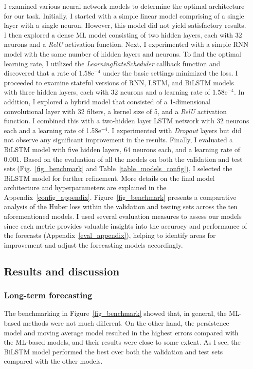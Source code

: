I examined various neural network models to determine the optimal architecture for our task.
Initially, I started with a simple linear model comprising of a single layer with a single neuron. However, this model did not yield satisfactory results.
I then explored a dense ML model consisting of two hidden layers, each with 32 neurons and a \textit{RelU} activation function. Next, I experimented with a simple RNN model with the same number of hidden layers and neurons.
To find the optimal learning rate, I utilized the \textit{LearningRateScheduler} callback function and discovered that a rate of 1.58e$^{-4}$ under the basic settings minimized the loss.
I proceeded to examine stateful versions of RNN, LSTM, and BiLSTM models with three hidden layers, each with 32 neurons and a learning rate of 1.58e$^{-4}$.
In addition, I explored a hybrid model that consisted of a 1-dimensional convolutional layer with 32 filters, a kernel size of 5, and a \textit{RelU} activation function. I combined this with a two-hidden layer LSTM network with 32 neurons each and a learning rate of 1.58e$^{-4}$. I experimented with \textit{Dropout} layers but did not observe any significant improvement in the results.
Finally, I evaluated a BiLSTM model with five hidden layers, 64 neurons each, and a learning rate of 0.001.
Based on the evaluation of all the models on both the validation and test sets (Fig.~\ref{fig_benchmark} and Table~\ref{table_models_config}), I selected the BiLSTM model for further refinement. More details on the final model architecture and hyperparameters are explained in the Appendix~\ref{config_appendix}.
Figure~\ref{fig_benchmark} presents a comparative analysis of the Huber loss within the validation and testing sets across the ten aforementioned models.
I used several evaluation measures to assess our models since each metric provides valuable insights into the accuracy and performance of the forecasts (Appendix~\ref{eval_appendix}), helping to identify areas for improvement and adjust the forecasting models accordingly.

\subsection{Results and discussion}
\subsubsection{Long-term forecasting}
The benchmarking in Figure~\ref{fig_benchmark} showed that, in general, the ML-based methods were not much different. On the other hand, the persistence model and moving average model resulted in the highest errors compared with the ML-based models, and their results were close to some extent. 
As I see, the BiLSTM model performed the best over both the validation and test sets compared with the other models.

